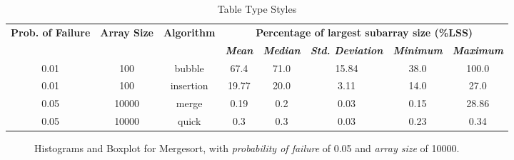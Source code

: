 \begin{table}[H]
    \caption{Table Type Styles}
    \begin{center}
    \begin{tabular}{|c|c|c|c|c|c|c|c|}
    \hline
    \textbf{Prob. of Failure} & \textbf{Array Size} & \textbf{Algorithm} & \multicolumn{5}{|c|}{\textbf{Percentage of largest subarray size (\%LSS)}} \\
    \cline{4-8} 
    & & & \textbf{\textit{Mean}}& \textbf{\textit{Median}} & \textbf{\textit{Std. Deviation}} & \textbf{\textit{Minimum}} & \textbf{\textit{Maximum}} \\
    \hline
    0.01 & 100 & bubble & 67.4 & 71.0 & 15.84 & 38.0 & 100.0 \\
    \hline
    0.01 & 100 & insertion & 19.77 & 20.0 & 3.11 & 14.0 & 27.0 \\
    \hline
    0.05 & 10000 & merge & 0.19 & 0.2 & 0.03 & 0.15 & 28.86 \\
    \hline
    0.05 & 10000 & quick & 0.3 & 0.3 & 0.03 & 0.23 & 0.34 \\
    \hline
    \end{tabular}
    \label{tab-distribution-depentent-variable-lss}
    \end{center}
\end{table}

\begin{figure}[H]
    \centering
    \caption{Histograms and Boxplot for Mergesort, with \textit{probability of failure} of 0.05 and \textit{array size} of 10000.}
    \label{fig-histogram-boxplot-merge-00510000}
\end{figure}


